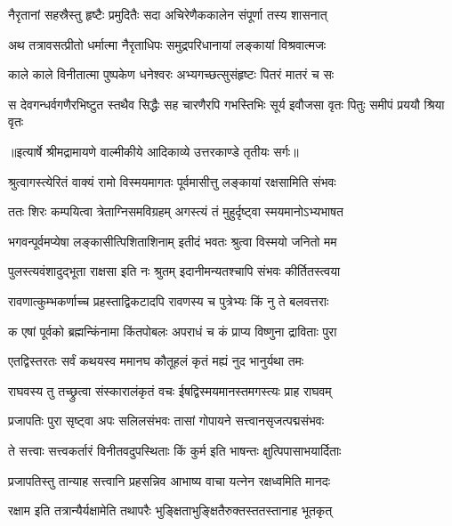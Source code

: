 \twolineshloka
{नैरृतानां सहस्रैस्तु हृष्टैः प्रमुदितैः सदा}
{अचिरेणैककालेन संपूर्णा तस्य शासनात्} %

\twolineshloka
{अथ तत्रावसत्प्रीतो धर्मात्मा नैरृताधिपः}
{समुद्रपरिधानायां लङ्कायां विश्रवात्मजः} %

\twolineshloka
{काले काले विनीतात्मा पुष्पकेण धनेश्वरः}
{अभ्यगच्छत्सुसंहृष्टः पितरं मातरं च सः} %

\fourlineindentedshloka
{स देवगन्धर्वगणैरभिष्टुत}
{स्तथैव सिद्धैः सह चारणैरपि}
{गभस्तिभिः सूर्य इवौजसा वृतः}
{ पितुः समीपं प्रययौ श्रिया वृतः} %


{॥इत्यार्षे श्रीमद्रामायणे वाल्मीकीये आदिकाव्ये उत्तरकाण्डे तृतीयः सर्गः॥}


\twolineshloka
{श्रुत्वागस्त्येरितं वाक्यं रामो विस्मयमागतः}
{पूर्वमासीत्तु लङ्कायां रक्षसामिति संभवः} %

\twolineshloka
{ततः शिरः कम्पयित्वा त्रेताग्निसमविग्रहम्}
{अगस्त्यं तं मुहुर्दृष्ट्वा स्मयमानोऽभ्यभाषत} %

\twolineshloka
{भगवन्पूर्वमप्येषा लङ्कासीत्पिशिताशिनाम्}
{इतीदं भवतः श्रुत्वा विस्मयो जनितो मम} %

\twolineshloka
{पुलस्त्यवंशादुद्भूता राक्षसा इति नः श्रुतम्}
{इदानीमन्यतश्चापि संभवः कीर्तितस्त्वया} %

\twolineshloka
{रावणात्कुम्भकर्णाच्च प्रहस्ताद्विकटादपि}
{रावणस्य च पुत्रेभ्यः किं नु ते बलवत्तराः} %

\twolineshloka
{क एषां पूर्वको ब्रह्मन्किंनामा किंतपोबलः}
{अपराधं च कं प्राप्य विष्णुना द्राविताः पुरा} %

\twolineshloka
{एतद्विस्तरतः सर्वं कथयस्व ममानघ}
{कौतूहलं कृतं मह्यं नुद भानुर्यथा तमः} %

\twolineshloka
{राघवस्य तु तच्छ्रुत्वा संस्कारालंकृतं वचः}
{ईषद्विस्मयमानस्तमगस्त्यः प्राह राघवम्} %

\twolineshloka
{प्रजापतिः पुरा सृष्ट्वा अपः सलिलसंभवः}
{तासां गोपायने सत्त्वानसृजत्पद्मसंभवः} %

\twolineshloka
{ते सत्त्वाः सत्त्वकर्तारं विनीतवदुपस्थिताः}
{किं कुर्म इति भाषन्तः क्षुत्पिपासाभयार्दिताः} %

\twolineshloka
{प्रजापतिस्तु तान्याह सत्त्वानि प्रहसन्निव}
{आभाष्य वाचा यत्नेन रक्षध्वमिति मानदः} %

\twolineshloka
{रक्षाम इति तत्रान्यैर्यक्षामेति तथापरैः}
{भुङ्क्षिताभुङ्क्षितैरुक्तस्ततस्तानाह भूतकृत्} %

